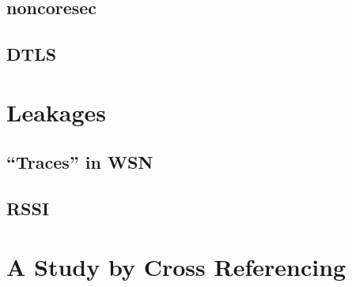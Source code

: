 \subsection{noncoresec}

\subsection{DTLS}

\section{Leakages}


\subsection{``Traces'' in WSN}

\subsection{RSSI}

\section{A Study by Cross Referencing}




